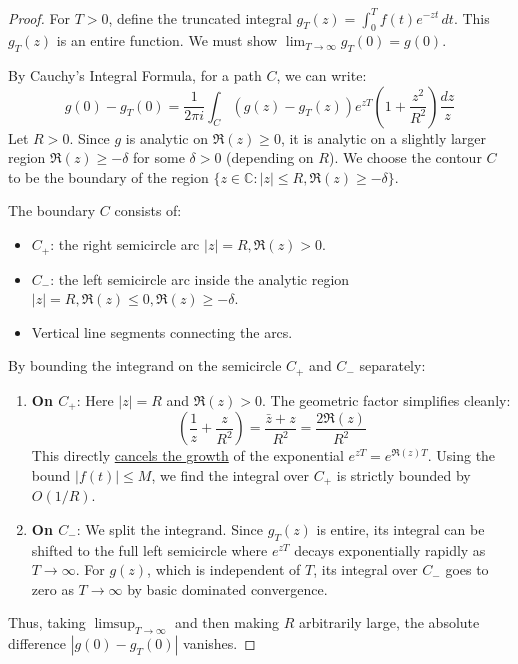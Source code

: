 \documentclass[12pt]{article}
\begin{document}
\begin{proof}
For $T > 0$, define the truncated integral $g_T(z) = \int_0^T f(t) e^{-zt} \, dt$. This $g_T(z)$ is an entire function. We must show $\lim_{T \to \infty} g_T(0) = g(0)$. 

By Cauchy's Integral Formula, for a path $C$, we can write:
\[ g(0) - g_T(0) = \frac{1}{2\pi i} \int_{C} \left( g(z) - g_T(z) \right) e^{zT} \hyperref[layer2:modifier]{\left( 1 + \frac{z^2}{R^2} \right)} \frac{dz}{z} \]
Let $R > 0$. Since $g$ is analytic on $\Re(z) \ge 0$, it is analytic on a slightly larger region $\Re(z) \ge -\delta$ for some $\delta > 0$ (depending on $R$). We choose the contour $C$ to be the boundary of the region $\{z \in \mathbb{C} : |z| \le R, \Re(z) \ge -\delta\}$.

The boundary $C$ consists of:
\begin{itemize}
    \item $C_+$: the right semicircle arc $|z| = R, \Re(z) > 0$.
    \item $C_-$: the left semicircle arc inside the analytic region $|z| = R, \Re(z) \le 0, \Re(z) \ge -\delta$.
    \item Vertical line segments connecting the arcs.
\end{itemize}

By bounding the integrand on the semicircle $C_+$ and $C_-$ separately:
\begin{enumerate}
    \item \textbf{On $C_+$}: Here $|z| = R$ and $\Re(z) > 0$. The geometric factor simplifies cleanly:
    \[ \left( \frac{1}{z} + \frac{z}{R^2} \right) = \frac{\bar{z} + z}{R^2} = \frac{2 \Re(z)}{R^2} \]
    This directly \hyperref[layer2:modifier]{cancels the growth} of the exponential $e^{zT} = e^{\Re(z)T}$. Using the bound $|f(t)| \le M$, we find the integral over $C_+$ is strictly bounded by $O(1/R)$.
    
    \item \textbf{On $C_-$}: We split the integrand. Since $g_T(z)$ is entire, its integral can be shifted to the full left semicircle where $e^{zT}$ decays exponentially rapidly as $T \to \infty$. For $g(z)$, which is independent of $T$, its integral over $C_-$ goes to zero as $T \to \infty$ by basic dominated convergence.
\end{enumerate}

Thus, taking $\limsup_{T \to \infty}$ and then making $R$ arbitrarily large, the absolute difference $|g(0) - g_T(0)|$ vanishes.
\end{proof}
\end{document}
